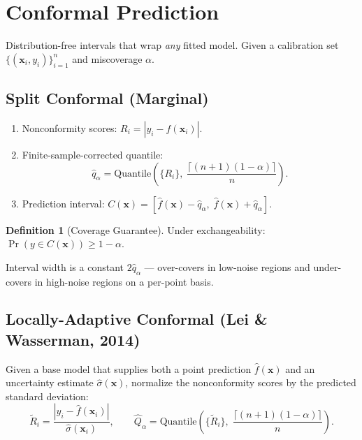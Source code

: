 \documentclass[11pt,a4paper]{article}
\theoremstyle{definition}
\newtheorem{definition}{Definition}[section]
\newcommand{\bx}{\mathbf{x}}
\begin{document}
\section{Conformal Prediction}
\label{sec:conformal}

Distribution-free intervals that wrap \emph{any} fitted model. Given a
calibration set $\{(\bx_i, y_i)\}_{i=1}^{n}$ and miscoverage $\alpha$.

\subsection{Split Conformal (Marginal)}
\label{sec:conformal_marginal}

\begin{enumerate}
  \item Nonconformity scores: $R_i = |y_i - \hat{f}(\bx_i)|$.
  \item Finite-sample-corrected quantile:
  \begin{equation}
    \hat{q}_\alpha = \text{Quantile}\left(\{R_i\}, \; \frac{\lceil (n+1)(1-\alpha) \rceil}{n}\right).
  \end{equation}
  \item Prediction interval:
  $C(\bx) = [\hat{f}(\bx) - \hat{q}_\alpha, \; \hat{f}(\bx) + \hat{q}_\alpha]$.
\end{enumerate}

\begin{definition}[Coverage Guarantee]
Under exchangeability:
$\Pr(y \in C(\bx)) \geq 1 - \alpha$.
\end{definition}

Interval width is a constant $2\hat{q}_\alpha$ --- over-covers in
low-noise regions and under-covers in high-noise regions on a
per-point basis.

\subsection{Locally-Adaptive Conformal (Lei \& Wasserman, 2014)}
\label{sec:conformal_adaptive}

Given a base model that supplies both a point prediction $\hat{f}(\bx)$
and an uncertainty estimate $\hat{\sigma}(\bx)$, normalize the
nonconformity scores by the predicted standard deviation:
\begin{equation}
  \tilde{R}_i = \frac{|y_i - \hat{f}(\bx_i)|}{\hat{\sigma}(\bx_i)},
  \qquad
  \hat{Q}_\alpha = \text{Quantile}\left(\{\tilde{R}_i\},\; \frac{\lceil (n+1)(1-\alpha) \rceil}{n}\right).
  \label{eq:lacw_quantile}
\end{equation}
\end{document}
